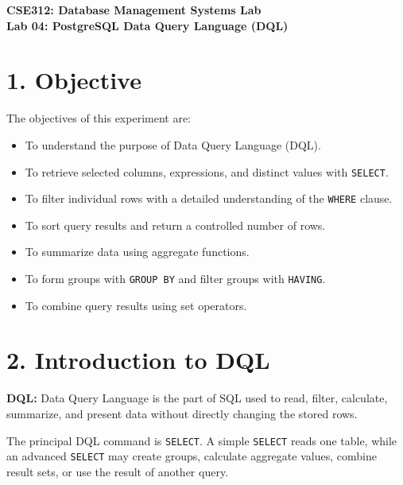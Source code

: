 \documentclass[12pt,a4paper]{article}
\newcommand{\defbox}[2]{%
  \vspace{0.2cm}
  \noindent\colorbox{boxgray}{\parbox{\dimexpr\linewidth-2\fboxsep}{%
    \textbf{#1:} #2
  }}
  \vspace{0.2cm}
}
\begin{document}
\begin{center}
    {\Large \textbf{CSE312: Database Management Systems Lab}}\\[0.3cm]
    {\large \textbf{Lab 04: PostgreSQL Data Query Language (DQL)}}
\end{center}

\vspace{0.5cm}

\section*{1. Objective}
The objectives of this experiment are:
\begin{itemize}
    \item To understand the purpose of Data Query Language (DQL).
    \item To retrieve selected columns, expressions, and distinct values with \texttt{SELECT}.
    \item To filter individual rows with a detailed understanding of the \texttt{WHERE} clause.
    \item To sort query results and return a controlled number of rows.
    \item To summarize data using aggregate functions.
    \item To form groups with \texttt{GROUP BY} and filter groups with \texttt{HAVING}.
    \item To combine query results using set operators.
\end{itemize}

\section*{2. Introduction to DQL}
\defbox{DQL}{Data Query Language is the part of SQL used to read, filter, calculate, summarize,
and present data without directly changing the stored rows.}

The principal DQL command is \texttt{SELECT}. A simple \texttt{SELECT} reads one table, while an
advanced \texttt{SELECT} may create groups, calculate aggregate values, combine result sets, or
use the result of another query.
\end{document}
